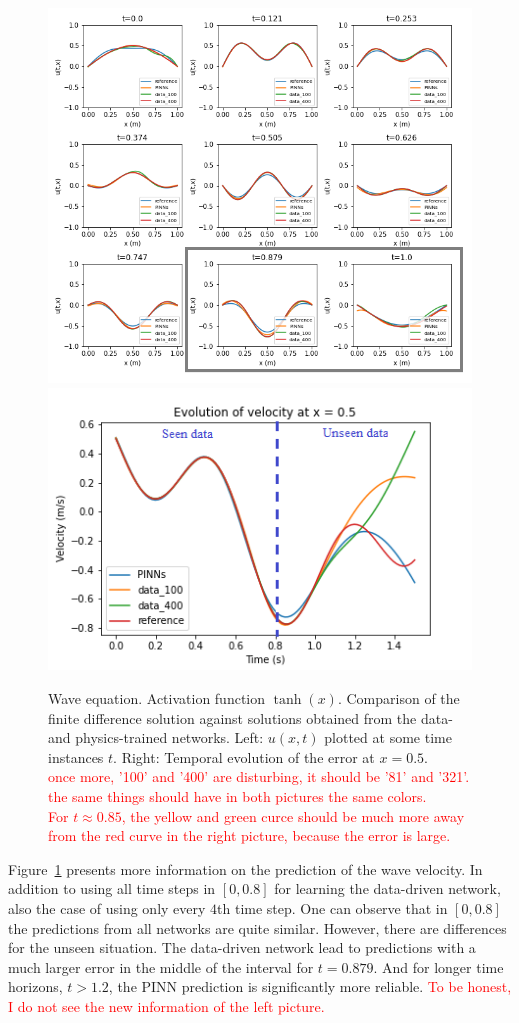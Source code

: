 \begin{figure}[t!]
\begin{center}
\includegraphics[width=0.45\linewidth]{../Code/B1/plots/wave_numerics.png}
\includegraphics[width=0.45\linewidth]{../Code/B1/plots/evolution_plot.png}
\end{center}
\caption{Wave equation. Activation function $\tanh(x)$. Comparison of the finite difference
solution against solutions obtained from the data- and physics-trained networks. 
Left: $u(x,t)$ plotted at some time instances $t$. Right: Temporal evolution of the error
at $x=0.5$.\\
\textcolor{red}{once more, '100' and '400' are disturbing, it should be '81' and '321'.}\\
\textcolor{red}{the same things should have in both pictures the same colors.}\\
\textcolor{red}{For $t\approx 0.85$, the yellow and green curce should be much more away from 
the red curve in the right picture, because the error is large.}}
\label{fig:wave_evolution}
\end{figure}

Figure~\ref{fig:wave_evolution} presents more information on the prediction of the wave velocity. 
In addition to using all time steps in $[0,0.8]$ for learning the data-driven network, also the 
case of using only every $4$th time step. One can observe that in $[0,0.8]$ the predictions 
from all networks are quite similar. However, there are differences for the unseen situation.
The data-driven network lead to predictions with a much larger error in the middle of the interval for $t=0.879$. And for longer time horizons, $t>1.2$, the PINN prediction is significantly more reliable.
\textcolor{red}{To be honest, I do not see the new information of the left picture.}


